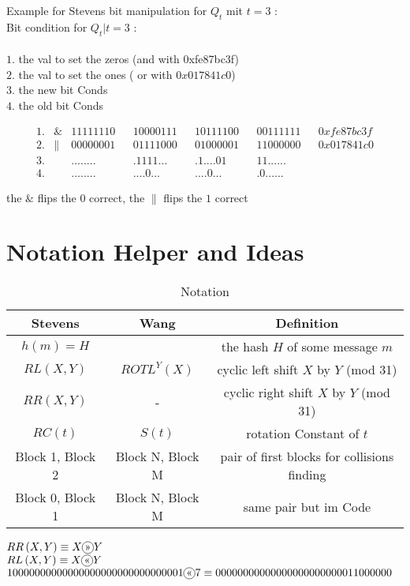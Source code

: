 Example for Stevens bit manipulation for $Q_t$ mit $t = 3$ :\\
Bit condition for $Q_t | t =3$ :\\
\\
$1.$ the val to set the zeros (and with 0xfe87bc3f)\\
$2.$ the val to set the ones ( or with $0x017841c0$)\\
$3.$ the new bit Conds\\
$4.$ the old bit Conds



\begin{align*}    
    1.& \& & 11111110 & & 10000111 & & 10111100 & & 00111111 & & 0xfe87bc3f \\
    2.& \| & 00000001 & & 01111000 & & 01000001 & & 11000000 & & 0x017841c0 \\
    3.&    & ........ & & .1111... & & .1....01 & & 11...... & &  \\
    4.&    & ........ & & ....0... & & ....0... & & .0...... & &  
\end{align*}

  the $\&$ flips the $0$ correct, the $\|$ flips the $1$ correct



\section{Notation Helper and Ideas}


\begin{table}[]
    \caption*{\large Notation}
    \begin{tabular}{ c | c | c }
    Stevens & Wang  & Definition  \\
    \hline 
    $h(m) = H$ &  & the hash $H$ of some message $m$\\
    $ RL \left(X , Y \right) $  & $ ROTL^{Y} \left( X\right) $  & cyclic left shift $X$ by $Y$ (mod 31) \\
    $ RR \left(X , Y \right) $  & -                             & cyclic right shift $X$ by $Y$ (mod 31) \\
    $ RC \left(t \right) $      &$ S \left(t \right) $          & rotation Constant of $t$ \\
    Block 1, Block 2 & Block N, Block M & pair of first blocks for collisions finding   \\
    Block 0, Block 1 & Block N, Block M & same pair but im Code\\
    \end{tabular}
    \label{notation}
\end{table}

$RR\left(X,Y\right) \equiv X  \circled{>>} Y$\\
$RL\left(X,Y\right) \equiv X  \circled{<<} Y$\\

$ 10000000000000000000000000000001  \circled{<<} 7 \equiv 00000000000000000000000011000000$


